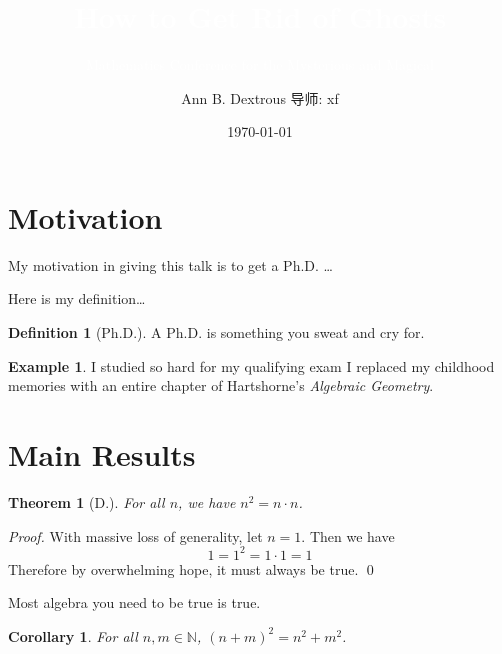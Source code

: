 \documentclass{beamer}	%
\title{\textcolor{white}{How to Get Rid of Ghosts}}
\subtitle{\textcolor{white}{Mathematics Conference for the Mysterious and Magical}}
\author{Ann B. Dextrous \quad \newline \newline 导师: xf}
\institute{北京工业大学}
\date{\today}
\newcommand{\N}{\mathbb{N}}
\newcommand{\pf}{\noindent\emph{Proof. }}
\theoremstyle{plain}
\newtheorem{thm}{Theorem}[section]
\newtheorem{cor}{Corollary}[section]
\theoremstyle{definition}
\newtheorem{ex}{Example}[section]
\newtheorem{dfn}{Definition}[section]
\theoremstyle{remark}
\numberwithin{equation}{section}
\begin{document}
\begin{frame}
\titlepage
\end{frame}



\section{Motivation}



\begin{frame}
My motivation in giving this talk is to get a Ph.D. \dots
\end{frame}



\begin{frame}
Here is my definition\dots

\begin{dfn}[Ph.D.]
A Ph.D. is something you sweat and cry for.
\end{dfn}

\begin{ex}
I studied so hard for my qualifying exam I replaced my childhood memories with an entire chapter of Hartshorne's \emph{Algebraic Geometry}.
\end{ex}
\end{frame}



\section{Main Results}



\begin{frame}
\begin{thm}[D.]
For all $n$, we have $n^2= n \cdot n$.
\end{thm}

\pf With massive loss of generality, let $n=1$. Then we have
	\[
	1=1^2= 1 \cdot 1= 1
	\]
Therefore by overwhelming hope, it must always be true. \qed
\end{frame}



\begin{frame}
Most algebra you need to be true is true.
\begin{cor}
For all $n,m \in \N$, $(n+m)^2= n^2 + m^2$.
\end{cor}
\end{frame}
\end{document}
